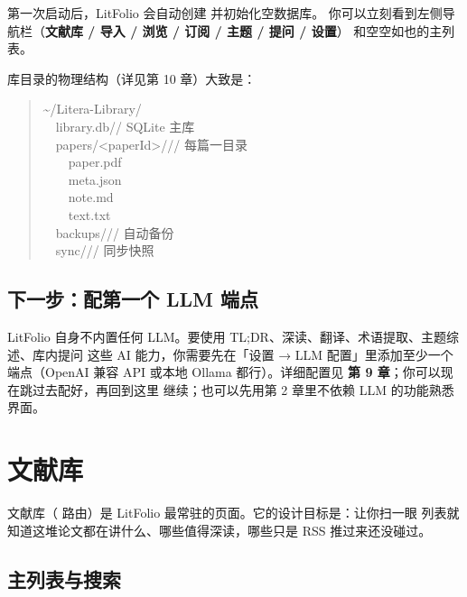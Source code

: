 第一次启动后，LitFolio 会自动创建  并初始化空数据库。
你可以立刻看到左侧导航栏（\textbf{文献库 / 导入 / 浏览 / 订阅 / 主题 / 提问 / 设置}）
和空空如也的主列表。


库目录的物理结构（详见第 10 章）大致是：

\begin{quote}\small\ttfamily
\textasciitilde/Litera-Library/\\
\ \ library.db\hfill\textnormal{\small // SQLite 主库}\\
\ \ papers/<paperId>/\hfill\textnormal{\small // 每篇一目录}\\
\ \ \ \ paper.pdf\\
\ \ \ \ meta.json\\
\ \ \ \ note.md\\
\ \ \ \ text.txt\\
\ \ backups/\hfill\textnormal{\small // 自动备份}\\
\ \ sync/\hfill\textnormal{\small // 同步快照}
\end{quote}

\section{下一步：配第一个 LLM 端点}

LitFolio 自身不内置任何 LLM。要使用 TL;DR、深读、翻译、术语提取、主题综述、库内提问
这些 AI 能力，你需要先在「设置 → LLM 配置」里添加至少一个端点（OpenAI 兼容 API
或本地 Ollama 都行）。详细配置见 \textbf{第 9 章}；你可以现在跳过去配好，再回到这里
继续；也可以先用第 2 章里不依赖 LLM 的功能熟悉界面。

\chapter{文献库}
\label{ch:library}

文献库（ 路由）是 LitFolio 最常驻的页面。它的设计目标是：让你扫一眼
列表就知道这堆论文都在讲什么、哪些值得深读，哪些只是 RSS 推过来还没碰过。

\section{主列表与搜索}

